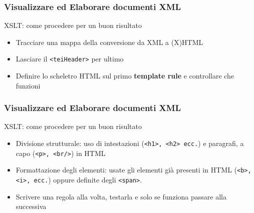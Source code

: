 \begin{frame}
    \frametitle{Visualizzare ed Elaborare documenti XML}
    \addtocounter{nframe}{1}
    

     \begin{block}{XSLT: come procedere per un buon risultato}
         \begin{itemize}
            \item Tracciare una mappa della conversione da XML a (X)HTML
             \item Lasciare il \texttt{<teiHeader>} per ultimo
             \item Definire lo scheletro HTML sul primo \textbf{template rule} e controllare che funzioni
        \end{itemize}
     \end{block}
    
\end{frame}

\begin{frame}
    \frametitle{Visualizzare ed Elaborare documenti XML}
    \addtocounter{nframe}{1}
    

     \begin{block}{XSLT: come procedere per un buon risultato}
         \begin{itemize}
             \item Divisione strutturale: uso di intestazioni (\texttt{<h1>, <h2> ecc.}) e
             paragrafi, a capo (\texttt{<p>, <br/>}) in HTML
             \item Formattazione degli elementi: usate gli elementi già presenti in
             HTML (\texttt{<b>, <i>, ecc.}) oppure definite degli \texttt{<span>}.
             \item Scrivere una regola alla volta, testarla e solo se funziona passare alla
             successiva
        \end{itemize}
     \end{block}
    
\end{frame}


